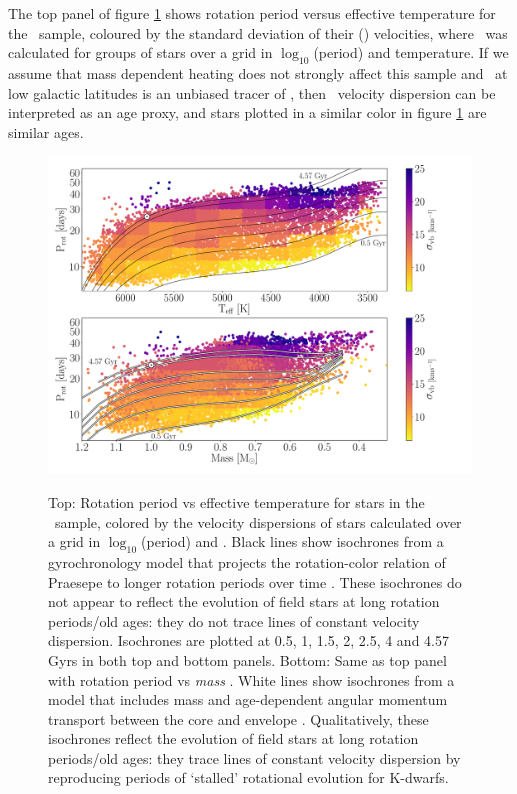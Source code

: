 The top panel of figure \ref{fig:vplot} shows rotation period versus effective
temperature for the \mct\ sample, coloured by the standard deviation of their
(\vb) velocities, where \sigmavb\ was calculated for groups of stars over a
grid in $\log_{10}$(period) and temperature.
If we assume that mass dependent heating does not strongly affect this sample
and \vb\ at low galactic latitudes is an unbiased tracer of \vz, then \vb\
velocity dispersion can be interpreted as an age proxy, and stars plotted in a
similar color in figure \ref{fig:vplot} are similar ages.
\begin{figure}
  \caption{
    Top: Rotation period vs effective temperature for stars in the \mct\
    sample, colored by the velocity dispersions of stars calculated over a
    grid in $\log_{10}$(period) and \teff.
    Black lines show isochrones from a gyrochronology model that projects the
    rotation-color relation of
    Praesepe to longer rotation periods over time \citep{angus2019}.
    These isochrones do not appear to reflect the evolution of field stars at
    long rotation periods/old ages: they do not trace lines of constant
    velocity dispersion.
    Isochrones are plotted at 0.5, 1, 1.5, 2, 2.5, 4 and 4.57 Gyrs in both top
    and bottom panels.
    Bottom: Same as top panel with rotation period vs {\it mass}
    \citep[from the Kepler Input Catalog][]{brown2011}.
    White lines show isochrones from a model that includes mass and
    age-dependent angular momentum transport between the core and envelope
    \citep{spada2019}.
    Qualitatively, these isochrones reflect the evolution of field
    stars at long rotation periods/old ages: they trace lines of constant
    velocity dispersion by reproducing periods of `stalled' rotational
    evolution for K-dwarfs.
}
  \centering
    \includegraphics[width=1\textwidth]{main_figure}
\label{fig:vplot}
\end{figure}

